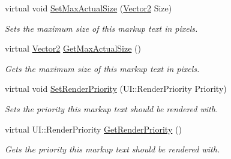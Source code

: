\begin{DoxyCompactItemize}
virtual void \hyperlink{classphys_1_1UI_1_1MarkupText_aca214ea8e68d56c6a0747f9854fa5034}{SetMaxActualSize} (\hyperlink{classphys_1_1Vector2}{Vector2} Size)
\begin{DoxyCompactList}\small\item\em Sets the maximum size of this markup text in pixels. \item\end{DoxyCompactList}\item 
virtual \hyperlink{classphys_1_1Vector2}{Vector2} \hyperlink{classphys_1_1UI_1_1MarkupText_a4a742f4d64038ded68c5480f4cf3e017}{GetMaxActualSize} ()
\begin{DoxyCompactList}\small\item\em Gets the maximum size of this markup text in pixels. \item\end{DoxyCompactList}\item 
virtual void \hyperlink{classphys_1_1UI_1_1MarkupText_a65662c49802fa5b82a04ac387b55493f}{SetRenderPriority} (UI::RenderPriority Priority)
\begin{DoxyCompactList}\small\item\em Sets the priority this markup text should be rendered with. \item\end{DoxyCompactList}\item 
virtual UI::RenderPriority \hyperlink{classphys_1_1UI_1_1MarkupText_a86afb23309534d86ed9675170b321874}{GetRenderPriority} ()
\begin{DoxyCompactList}\small\item\em Gets the priority this markup text should be rendered with. \item\end{DoxyCompactList}\end{DoxyCompactItemize}

